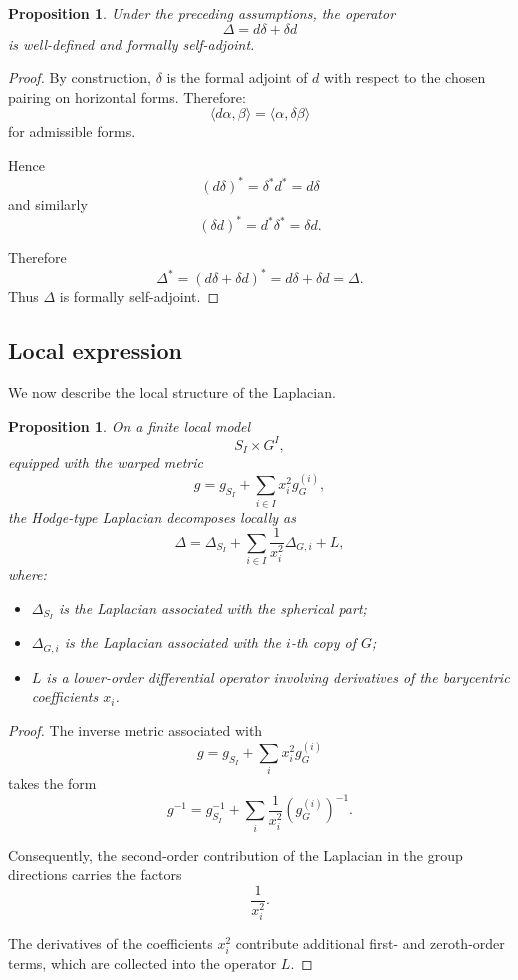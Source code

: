 \documentclass[11pt]{amsart}
\newtheorem{proposition}[theorem]{Proposition}
\begin{document}
\begin{proposition}
Under the preceding assumptions, the operator
\[
\Delta
=
d\delta+\delta d
\]
is well-defined and formally self-adjoint.
\end{proposition}

\begin{proof}
By construction, \(\delta\) is the formal adjoint of \(d\) with respect to
the chosen pairing on horizontal forms. Therefore:
\[
\langle d\alpha,\beta\rangle
=
\langle \alpha,\delta\beta\rangle
\]
for admissible forms.

Hence
\[
(d\delta)^*=\delta^*d^*=d\delta
\]
and similarly
\[
(\delta d)^*=d^*\delta^*=\delta d.
\]

Therefore
\[
\Delta^*
=
(d\delta+\delta d)^*
=
d\delta+\delta d
=
\Delta.
\]
Thus \(\Delta\) is formally self-adjoint.
\end{proof}

\subsection{Local expression}

We now describe the local structure of the Laplacian.

\begin{proposition}
On a finite local model
\[
S_I\times G^I,
\]
equipped with the warped metric
\[
g
=
g_{S_I}
+
\sum_{i\in I}x_i^2g_G^{(i)},
\]
the Hodge-type Laplacian decomposes locally as
\[
\Delta
=
\Delta_{S_I}
+
\sum_{i\in I}\frac1{x_i^2}\Delta_{G,i}
+
L,
\]
where:
\begin{itemize}
\item \(\Delta_{S_I}\) is the Laplacian associated with the spherical part;
\item \(\Delta_{G,i}\) is the Laplacian associated with the \(i\)-th copy of
\(G\);
\item \(L\) is a lower-order differential operator involving derivatives of
the barycentric coefficients \(x_i\).
\end{itemize}
\end{proposition}

\begin{proof}
The inverse metric associated with
\[
g
=
g_{S_I}
+
\sum_i x_i^2g_G^{(i)}
\]
takes the form
\[
g^{-1}
=
g_{S_I}^{-1}
+
\sum_i \frac1{x_i^2}(g_G^{(i)})^{-1}.
\]

Consequently, the second-order contribution of the Laplacian in the group
directions carries the factors
\[
\frac1{x_i^2}.
\]

The derivatives of the coefficients \(x_i^2\) contribute additional first-
and zeroth-order terms, which are collected into the operator \(L\).
\end{proof}
\end{document}
